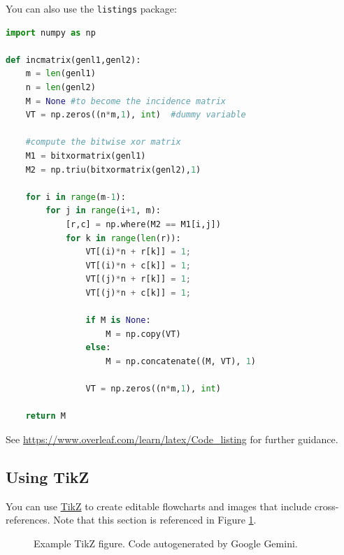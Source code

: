 \documentclass{article}
\begin{document}
You can also use the \texttt{listings} package:
\begin{lstlisting}[language=Python, caption=Python example]
import numpy as np
    
def incmatrix(genl1,genl2):
    m = len(genl1)
    n = len(genl2)
    M = None #to become the incidence matrix
    VT = np.zeros((n*m,1), int)  #dummy variable
    
    #compute the bitwise xor matrix
    M1 = bitxormatrix(genl1)
    M2 = np.triu(bitxormatrix(genl2),1) 

    for i in range(m-1):
        for j in range(i+1, m):
            [r,c] = np.where(M2 == M1[i,j])
            for k in range(len(r)):
                VT[(i)*n + r[k]] = 1;
                VT[(i)*n + c[k]] = 1;
                VT[(j)*n + r[k]] = 1;
                VT[(j)*n + c[k]] = 1;
                
                if M is None:
                    M = np.copy(VT)
                else:
                    M = np.concatenate((M, VT), 1)
                
                VT = np.zeros((n*m,1), int)
    
    return M
\end{lstlisting}

See \url{https://www.overleaf.com/learn/latex/Code_listing} for further guidance.


\subsection{Using TikZ}
\label{sec:tikz}
You can use \href{https://texample.net//tikz/examples/}{TikZ} to create editable flowcharts and images that include cross-references. Note that this section is referenced in Figure \ref{fig:tikz1}.

\begin{figure}
    \centering


    \caption{Example TikZ figure. Code autogenerated by Google Gemini.}
    \label{fig:tikz1}
\end{figure}
\end{document}
